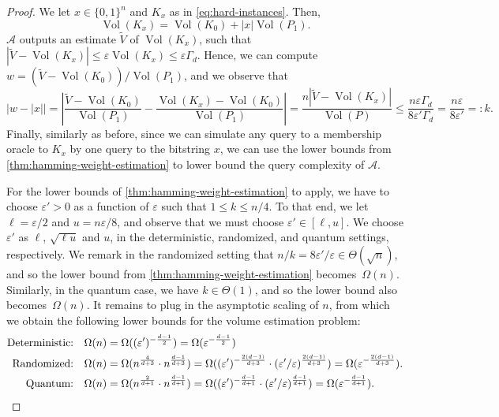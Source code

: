 \documentclass[11pt]{article}
\newcommand{\A}{\ensuremath{\mathcal{A}}}
\DeclareMathOperator{\Vol}{Vol}
\begin{document}
\begin{proof}
        We let $x \in \{0,1\}^n$ and $K_x$ as in \cref{eq:hard-instances}. Then,
        \[\Vol(K_x) = \Vol(K_0) + |x|\Vol(P_1).\]
        $\A$ outputs an estimate $\widetilde{V}$ of $\Vol(K_x)$, such that $|\widetilde{V} - \Vol(K_x)| \leq \varepsilon\Vol(K_x) \leq \varepsilon\Gamma_d$. Hence, we can compute $w = (\widetilde{V} - \Vol(K_0))/\Vol(P_1)$, and we observe that
        \[|w - |x|| = \left|\frac{\widetilde{V} - \Vol(K_0)}{\Vol(P_1)} - \frac{\Vol(K_x) - \Vol(K_0)}{\Vol(P_1)}\right| = \frac{n|\widetilde{V} - \Vol(K_x)|}{\Vol(P)} \leq \frac{n\varepsilon\Gamma_d}{8\varepsilon'\Gamma_d} = \frac{n\varepsilon}{8\varepsilon'} =: k.\]
        Finally, similarly as before, since we can simulate any query to a membership oracle to $K_x$ by one query to the bitstring $x$, we can use the lower bounds from \cref{thm:hamming-weight-estimation} to lower bound the query complexity of $\A$.

        For the lower bounds of \cref{thm:hamming-weight-estimation} to apply, we have to choose $\varepsilon' > 0$ as a function of $\varepsilon$ such that $1 \leq k \leq n/4$. To that end, we let $\ell = \varepsilon/2$ and $u = n\varepsilon/8$, and observe that we must choose $\varepsilon' \in [\ell,u]$. We choose $\varepsilon'$ as $\ell$, $\sqrt{\ell u}$ and $u$, in the deterministic, randomized, and quantum settings, respectively. We remark in the randomized setting that $n/k = 8\varepsilon'/\varepsilon \in \Theta(\sqrt{n})$, and so the lower bound from \cref{thm:hamming-weight-estimation} becomes~$\Omega(n)$. Similarly, in the quantum case, we have $k \in \Theta(1)$, and so the lower bound also becomes~$\Omega(n)$. It remains to plug in the asymptotic scaling of $n$, from which we obtain the following lower bounds for the volume estimation problem:
        \begin{align*}
            \textrm{Deterministic:}\quad & \Omega(n) = \Omega((\varepsilon')^{-\frac{d-1}{2}}) = \Omega(\varepsilon^{-\frac{d-1}{2}}) \\
            \textrm{Randomized:}\quad & \Omega(n) = \Omega(n^{\frac{4}{d+3}} \cdot n^{\frac{d-1}{d+3}}) = \Omega((\varepsilon')^{-\frac{2(d-1)}{d+3}} \cdot (\varepsilon'/\varepsilon)^{\frac{2(d-1)}{d+3}}) = \Omega(\varepsilon^{-\frac{2(d-1)}{d+3}}). \\
            \textrm{Quantum:}\quad & \Omega(n) = \Omega(n^{\frac{2}{d+1}} \cdot n^{\frac{d-1}{d+1}}) = \Omega((\varepsilon')^{-\frac{d-1}{d+1}} \cdot (\varepsilon'/\varepsilon)^{\frac{d-1}{d+1}}) = \Omega(\varepsilon^{-\frac{d-1}{d+1}}).\qedhere
        \end{align*}
    \end{proof}
\end{document}

